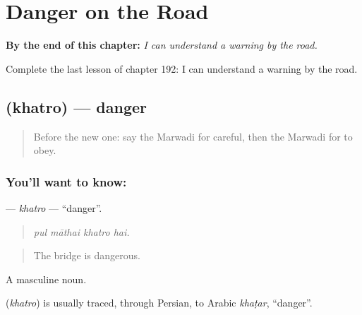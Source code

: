 
\chapter{Danger on the Road}
\label{ch:mw-danger-on-the-road}

\begin{chapteropening}
\textbf{By the end of this chapter:} \emph{I can understand a warning by the road.}

Complete the last lesson of chapter 192: I can understand a warning by the road.
\end{chapteropening}

\section[\texorpdfstring{\mw{खतरो} (khatro)}{खतरो (khatro)}]{ (khatro) — danger}

\label{lesson:MW-C192-khatro}



\begin{quote}
Before the new one: say the Marwadi for careful, then the Marwadi for to obey.
\end{quote}

\subsection*{You'll want to know: }
\textbf{} — \emph{khatro} — \textquotedblleft{}danger\textquotedblright{}.

\begin{quote}
   
\end{quote}

\begin{quote}
\emph{pul māthai khatro hai.}
\end{quote}

\begin{quote}
The bridge is dangerous.
\end{quote}

A masculine noun.

\begin{cousinweb}
\textbf{} (\emph{khatro}) is usually traced, through Persian, to Arabic \emph{khaṭar}, \textquotedblleft{}danger\textquotedblright{}.
\end{cousinweb}

